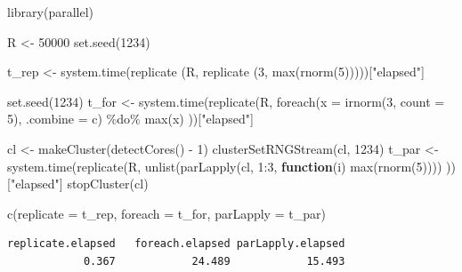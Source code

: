\documentclass[
  letterpaper,
  DIV=11,
  numbers=noendperiod]{scrreprt}
\newenvironment{Shaded}{\begin{snugshade}}{\end{snugshade}}
\newcommand{\AttributeTok}[1]{\textcolor[rgb]{0.40,0.45,0.13}{#1}}
\newcommand{\ControlFlowTok}[1]{\textcolor[rgb]{0.00,0.23,0.31}{\textbf{#1}}}
\newcommand{\DecValTok}[1]{\textcolor[rgb]{0.68,0.00,0.00}{#1}}
\newcommand{\FunctionTok}[1]{\textcolor[rgb]{0.28,0.35,0.67}{#1}}
\newcommand{\NormalTok}[1]{\textcolor[rgb]{0.00,0.23,0.31}{#1}}
\newcommand{\OtherTok}[1]{\textcolor[rgb]{0.00,0.23,0.31}{#1}}
\newcommand{\SpecialCharTok}[1]{\textcolor[rgb]{0.37,0.37,0.37}{#1}}
\newcommand{\StringTok}[1]{\textcolor[rgb]{0.13,0.47,0.30}{#1}}
\begin{document}
\begin{Shaded}
\begin{Highlighting}[]
\FunctionTok{library}\NormalTok{(parallel)}

\NormalTok{R }\OtherTok{\textless{}{-}} \DecValTok{50000}
\FunctionTok{set.seed}\NormalTok{(}\DecValTok{1234}\NormalTok{)}

\NormalTok{t\_rep }\OtherTok{\textless{}{-}} \FunctionTok{system.time}\NormalTok{(replicate}
\NormalTok{                     (R, replicate}
\NormalTok{                       (}\DecValTok{3}\NormalTok{, }\FunctionTok{max}\NormalTok{(}\FunctionTok{rnorm}\NormalTok{(}\DecValTok{5}\NormalTok{)))))[}\StringTok{"elapsed"}\NormalTok{]}

\FunctionTok{set.seed}\NormalTok{(}\DecValTok{1234}\NormalTok{)}
\NormalTok{t\_for }\OtherTok{\textless{}{-}} \FunctionTok{system.time}\NormalTok{(}\FunctionTok{replicate}\NormalTok{(R,}
  \FunctionTok{foreach}\NormalTok{(}\AttributeTok{x =} \FunctionTok{irnorm}\NormalTok{(}\DecValTok{3}\NormalTok{, }\AttributeTok{count =} \DecValTok{5}\NormalTok{), }\AttributeTok{.combine =}\NormalTok{ c) }\SpecialCharTok{\%do\%} \FunctionTok{max}\NormalTok{(x)}
\NormalTok{))[}\StringTok{"elapsed"}\NormalTok{]}

\NormalTok{cl }\OtherTok{\textless{}{-}} \FunctionTok{makeCluster}\NormalTok{(}\FunctionTok{detectCores}\NormalTok{() }\SpecialCharTok{{-}} \DecValTok{1}\NormalTok{)}
\FunctionTok{clusterSetRNGStream}\NormalTok{(cl, }\DecValTok{1234}\NormalTok{)}
\NormalTok{t\_par }\OtherTok{\textless{}{-}} \FunctionTok{system.time}\NormalTok{(}\FunctionTok{replicate}\NormalTok{(R,}
  \FunctionTok{unlist}\NormalTok{(}\FunctionTok{parLapply}\NormalTok{(cl, }\DecValTok{1}\SpecialCharTok{:}\DecValTok{3}\NormalTok{, }\ControlFlowTok{function}\NormalTok{(i) }\FunctionTok{max}\NormalTok{(}\FunctionTok{rnorm}\NormalTok{(}\DecValTok{5}\NormalTok{))))}
\NormalTok{))[}\StringTok{"elapsed"}\NormalTok{]}
\FunctionTok{stopCluster}\NormalTok{(cl)}

\FunctionTok{c}\NormalTok{(}\AttributeTok{replicate =}\NormalTok{ t\_rep, }\AttributeTok{foreach =}\NormalTok{ t\_for, }\AttributeTok{parLapply =}\NormalTok{ t\_par)}
\end{Highlighting}
\end{Shaded}

\begin{verbatim}
replicate.elapsed   foreach.elapsed parLapply.elapsed 
            0.367            24.489            15.493 
\end{verbatim}
\end{document}
